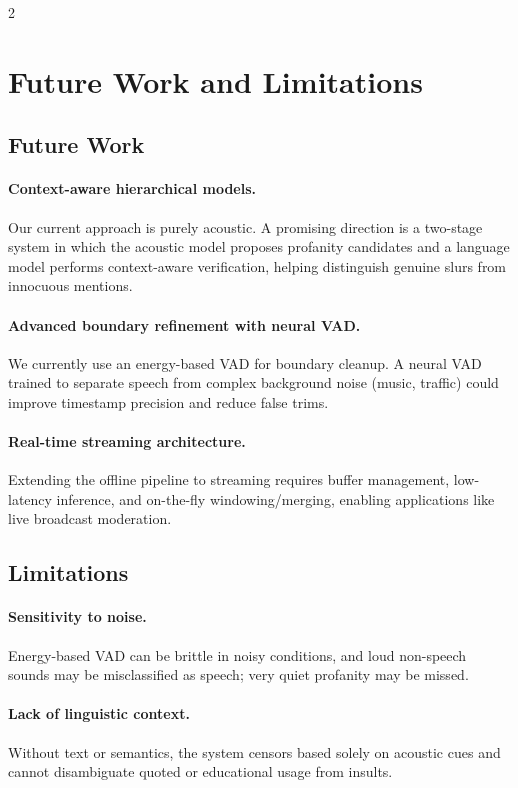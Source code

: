 \documentclass[11pt,a4paper]{article}
\begin{document}
\begin{multicols}{2}
\section{Future Work and Limitations}
\subsection{Future Work}
\paragraph{Context-aware hierarchical models.} Our current approach is purely acoustic. A promising direction is a two-stage system in which the acoustic model proposes profanity candidates and a language model performs context-aware verification, helping distinguish genuine slurs from innocuous mentions.

\paragraph{Advanced boundary refinement with neural VAD.} We currently use an energy-based VAD for boundary cleanup. A neural VAD trained to separate speech from complex background noise (music, traffic) could improve timestamp precision and reduce false trims.

\paragraph{Real-time streaming architecture.} Extending the offline pipeline to streaming requires buffer management, low-latency inference, and on-the-fly windowing/merging, enabling applications like live broadcast moderation.

\subsection{Limitations}
\paragraph{Sensitivity to noise.} Energy-based VAD can be brittle in noisy conditions, and loud non-speech sounds may be misclassified as speech; very quiet profanity may be missed.

\paragraph{Lack of linguistic context.} Without text or semantics, the system censors based solely on acoustic cues and cannot disambiguate quoted or educational usage from insults.


\end{multicols}
\end{document}
